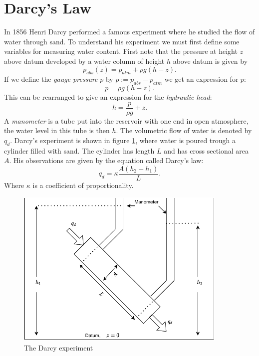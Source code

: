 \documentclass[../Main/main.tex]{subfiles}
\begin{document}
\section*{Darcy's Law}
In 1856 Henri Darcy performed a famous experiment where he studied the flow of water through sand. To understand his experiment we must first define some variables for measuring water content. First note that the pressure at height $z$ above datum developed by a water column of height $h$ above datum is given by
\begin{equation*}
p_{abs}(z) = p_{atm} + \rho g(h-z).
\end{equation*}
If we define the \emph{gauge pressure} $p$ by $p := p_{abs}-p_{atm}$ we get an expression for $p$:
\begin{equation*}
p = \rho g(h-z).
\end{equation*}
This can be rearranged to give an expression for the \emph{hydraulic head}:
\begin{equation}\label{eq:hydraulic}
h = \frac{p}{\rho g} + z.
\end{equation}
A \emph{manometer} is a tube put into the reservoir with one end in open atmosphere, the water level in this tube is then $h$. The volumetric flow of water is denoted by $q_d$. Darcy's experiment is shown in figure \ref{fig:darcy}, where water is poured trough a cylinder filled with sand. The cylinder has length $L$ and has cross sectional area $A$. His observations are given by the equation called Darcy's law:
\begin{equation}
q_d = \kappa \frac{A(h_2-h_1)}{L}.
\end{equation}
Where $\kappa$ is a coefficient of proportionality.
\begin{figure}[h]
\centering
\includegraphics[width=0.9\textwidth]{Darcy experiment.pdf}
\caption{The Darcy experiment}
\label{fig:darcy}
\end{figure}
\end{document}
